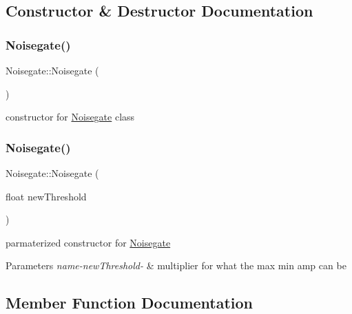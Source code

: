 \subsection{Constructor \& Destructor Documentation}
\mbox{\label{classNoisegate_a15c5621437e7378814c69a58fc60b326}} 
\subsubsection{\texorpdfstring{Noisegate()}{Noisegate()}\hspace{0.1cm}{\footnotesize\ttfamily [1/2]}}
{\footnotesize\ttfamily Noisegate\+::\+Noisegate (\begin{DoxyParamCaption}{ }\end{DoxyParamCaption})}

constructor for \hyperlink{classNoisegate}{Noisegate} class \mbox{\label{classNoisegate_a4dc5881a80f29ebc6e9be12dae2bd632}} 
\subsubsection{\texorpdfstring{Noisegate()}{Noisegate()}\hspace{0.1cm}{\footnotesize\ttfamily [2/2]}}
{\footnotesize\ttfamily Noisegate\+::\+Noisegate (\begin{DoxyParamCaption}\item[{float}]{new\+Threshold }\end{DoxyParamCaption})}

parmaterized constructor for \hyperlink{classNoisegate}{Noisegate} 
\begin{DoxyParams}{Parameters}
{\em name-\/new\+Threshold-\/} & multiplier for what the max min amp can be \\
\hline
\end{DoxyParams}


\subsection{Member Function Documentation}
\mbox{\label{classNoisegate_aee5ff92d38286e509055fa6d117415fd}} 
